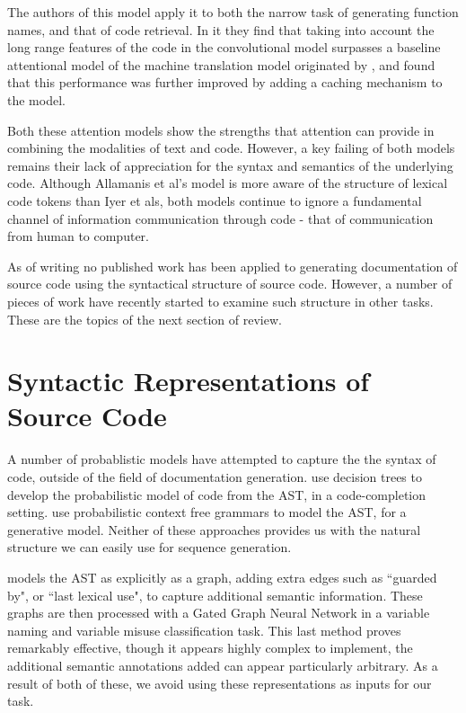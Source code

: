 The authors of this model apply it to both the narrow task of generating function names, and that of code retrieval. In it they find that taking into account the long range features of the code in the convolutional model surpasses a baseline attentional model of the machine translation model originated by \citet{bahdanau_neural_2014}, and found that this performance was further improved by adding a caching mechanism to the model.

Both these attention models show the strengths that attention can provide in combining the modalities of text and code. However, a key failing of both models remains their lack of appreciation for the syntax and semantics of the underlying code.
Although Allamanis et al's model is more aware of the structure of lexical code tokens than Iyer et als, both models continue to ignore a fundamental channel of information communication through code - that of communication from human to computer.


As of writing no published work has been applied to generating documentation of source code using the syntactical structure of source code.  However, a number of pieces of work have recently started to examine such structure in other tasks. These are the topics of the next section of review.

\section{Syntactic Representations of Source Code}

A number of probablistic models have attempted to capture the the syntax of code, outside of the field of documentation generation.
\citet{raychev_probabilistic_nodate} use decision trees to develop the probabilistic model of code from the AST, in a code-completion setting. 
\citet{maddison_structured_2014} use probabilistic context free grammars to model the AST, for a generative model. 
Neither of these approaches provides us with the natural structure we can easily use for sequence generation. 

\citet{allamanis_learning_2017} models the AST as explicitly as a graph, adding extra edges such as ``guarded by", or ``last lexical use", to capture additional semantic information. These graphs are then processed with a Gated Graph Neural Network \citep{gated-graph-sequence-neural-networks} in a variable naming and variable misuse classification task. 
This last method proves remarkably effective, though it appears highly complex to implement, the additional semantic annotations added can appear particularly arbitrary. As a result of both of these, we avoid using these representations as inputs for our task.

